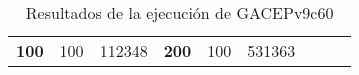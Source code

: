 \begin{table}[H]
\begin{tabular}{|ccrccrccc}
\multicolumn{1}{|c|}{\multirow{-39}{*}{\cellcolor[HTML]{FFFFC7}\textbf{100}}} & \multicolumn{1}{c|}{\multirow{-9}{*}{\cellcolor[HTML]{DDFDFF}100}} & \multicolumn{1}{r|}{\cellcolor[HTML]{DAE8FC}112348}    & \multicolumn{1}{c|}{\multirow{-39}{*}{\cellcolor[HTML]{FFFFC7}\textbf{200}}} & \multicolumn{1}{c|}{\multirow{-10}{*}{\cellcolor[HTML]{DDFDFF}100}} & \multicolumn{1}{r|}{\cellcolor[HTML]{DDFDFF}531363}    &                                                                              &                                                                    &                                                        \\ \cline{1-6}
\end{tabular}
\caption{\label{res:GACEPv9c60}Resultados de la ejecución de GACEPv9c60}
\end{table}

